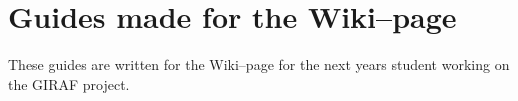 \chapter{Guides made for the Wiki--page}\label{app:guides}
These guides are written for the Wiki--page for the next years student working on the GIRAF project.







